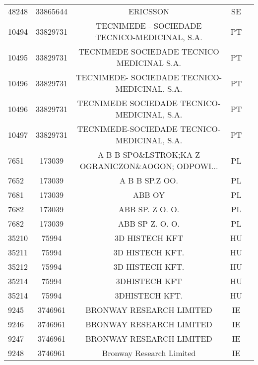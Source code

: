 \begin{longtable}{|l|c|c|c|c|}
     48248 &   33865644 &                                           ERICSSON &      SE \\
     10494 &   33829731 &      TECNIMEDE - SOCIEDADE TECNICO-MEDICINAL, S.A. &      PT \\
     10495 &   33829731 &         TECNIMEDE SOCIEDADE TECNICO MEDICINAL S.A. &      PT \\
     10496 &   33829731 &       TECNIMEDE- SOCIEDADE TECNICO-MEDICINAL, S.A. &      PT \\
     10496 &   33829731 &        TECNIMEDE SOCIEDADE TECNICO-MEDICINAL, S.A. &      PT \\
     10497 &   33829731 &        TECNIMEDE-SOCIEDADE TECNICO-MEDICINAL, S.A. &      PT \\
      7651 &     173039 &  A B B SPO\&LSTROK;KA Z OGRANICZON\&AOGON; ODPOWI... &      PL \\
      7652 &     173039 &                                     A B B SP.Z OO. &      PL \\
      7681 &     173039 &                                             ABB OY &      PL \\
      7682 &     173039 &                                    ABB SP. Z O. O. &      PL \\
      7682 &     173039 &                                    ABB SP Z. O. O. &      PL \\
     35210 &      75994 &                                     3D HISTECH KFT &      HU \\
     35211 &      75994 &                                    3D HISTECH KFT. &      HU \\
     35212 &      75994 &                                    3D HISTECH KFT. &      HU \\
     35214 &      75994 &                                      3DHISTECH KFT &      HU \\
     35214 &      75994 &                                     3DHISTECH KFT. &      HU \\
      9245 &    3746961 &                           BRONWAY RESEARCH LIMITED &      IE \\
      9246 &    3746961 &                           BRONWAY RESEARCH LIMITED &      IE \\
      9247 &    3746961 &                           BRONWAY RESEARCH LIMITED &      IE \\
      9248 &    3746961 &                           Bronway Research Limited &      IE \\

\end{longtable}
